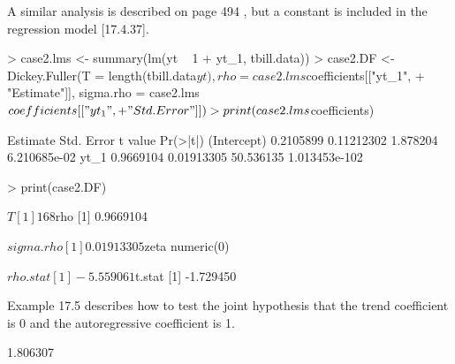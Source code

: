 A similar analysis is described on page 494 , but a constant is included in the regression model [17.4.37].
\begin{Schunk}
\begin{Sinput}
> case2.lms <- summary(lm(yt ~ 1 + yt_1, tbill.data))
> case2.DF <- Dickey.Fuller(T = length(tbill.data$yt), rho = case2.lms$coefficients[["yt_1", 
+     "Estimate"]], sigma.rho = case2.lms$coefficients[["yt_1", 
+     "Std. Error"]])
> print(case2.lms$coefficients)
\end{Sinput}
\begin{Soutput}
             Estimate Std. Error   t value      Pr(>|t|)
(Intercept) 0.2105899 0.11212302  1.878204  6.210685e-02
yt_1        0.9669104 0.01913305 50.536135 1.013453e-102
\end{Soutput}
\begin{Sinput}
> print(case2.DF)
\end{Sinput}
\begin{Soutput}
$T
[1] 168

$rho
[1] 0.9669104

$sigma.rho
[1] 0.01913305

$zeta
numeric(0)

$rho.stat
[1] -5.559061

$t.stat
[1] -1.729450
\end{Soutput}
\end{Schunk}
Example 17.5 describes how to test the joint hypothesis that the trend coefficient is 0 and the autoregressive
coefficient is 1.
\begin{Schunk}
\begin{Soutput}
[1] 1.806307
\end{Soutput}
\end{Schunk}
